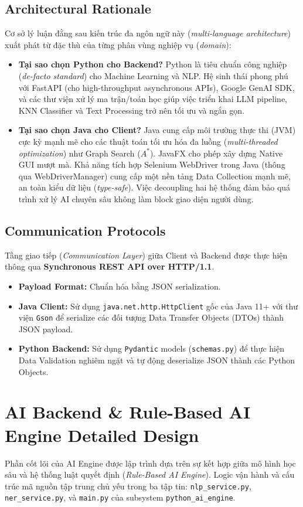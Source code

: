 \documentclass[12pt,a4paper]{article}
\begin{document}
\subsection{Architectural Rationale}
Cơ sở lý luận đằng sau kiến trúc đa ngôn ngữ này (\textit{multi-language architecture}) xuất phát từ đặc thù của từng phân vùng nghiệp vụ (\textit{domain}):
\begin{itemize}
    \item \textbf{Tại sao chọn Python cho Backend?} Python là tiêu chuẩn công nghiệp (\textit{de-facto standard}) cho Machine Learning và NLP. Hệ sinh thái phong phú với FastAPI (cho high-throughput asynchronous APIs), Google GenAI SDK, và các thư viện xử lý ma trận/toán học giúp việc triển khai LLM pipeline, KNN Classifier và Text Processing trở nên tối ưu và ngắn gọn.
    \item \textbf{Tại sao chọn Java cho Client?} Java cung cấp môi trường thực thi (JVM) cực kỳ mạnh mẽ cho các thuật toán tối ưu hóa đa luồng (\textit{multi-threaded optimization}) như Graph Search ($A^*$). JavaFX cho phép xây dựng Native GUI mượt mà. Khả năng tích hợp Selenium WebDriver trong Java (thông qua WebDriverManager) cung cấp một nền tảng Data Collection mạnh mẽ, an toàn kiểu dữ liệu (\textit{type-safe}). Việc decoupling hai hệ thống đảm bảo quá trình xử lý AI chuyên sâu không làm block giao diện người dùng.
\end{itemize}

\subsection{Communication Protocols}
Tầng giao tiếp (\textit{Communication Layer}) giữa Client và Backend được thực hiện thông qua \textbf{Synchronous REST API over HTTP/1.1}.
\begin{itemize}
    \item \textbf{Payload Format:} Chuẩn hóa bằng JSON serialization.
    \item \textbf{Java Client:} Sử dụng \texttt{java.net.http.HttpClient} gốc của Java 11+ với thư viện \texttt{Gson} để serialize các đối tượng Data Transfer Objects (DTOs) thành JSON payload.
    \item \textbf{Python Backend:} Sử dụng \texttt{Pydantic} models (\texttt{schemas.py}) để thực hiện Data Validation nghiêm ngặt và tự động deserialize JSON thành các Python Objects.
\end{itemize}

\newpage

\section{AI Backend \& Rule-Based AI Engine Detailed Design}
Phần cốt lõi của AI Engine được lập trình dựa trên sự kết hợp giữa mô hình học sâu và hệ thống luật quyết định (\textit{Rule-Based AI Engine}). Logic vận hành và cấu trúc mã nguồn tập trung chủ yếu trong ba tập tin: \texttt{nlp\_service.py}, \texttt{ner\_service.py}, và \texttt{main.py} của subsystem \texttt{python\_ai\_engine}.
\end{document}

